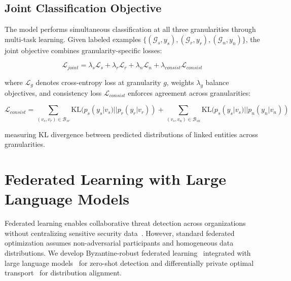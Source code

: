 \subsection{Joint Classification Objective}

The model performs simultaneous classification at all three granularities through multi-task learning. Given labeled examples $\{(\mathcal{G}_s, y_s), (\mathcal{G}_r, y_r), (\mathcal{G}_n, y_n)\}$, the joint objective combines granularity-specific losses:

\begin{equation}
\mathcal{L}_{joint} = \lambda_s \mathcal{L}_s + \lambda_r \mathcal{L}_r + \lambda_n \mathcal{L}_n + \lambda_{consist} \mathcal{L}_{consist}
\end{equation}

where $\mathcal{L}_g$ denotes cross-entropy loss at granularity $g$, weights $\lambda_g$ balance objectives, and consistency loss $\mathcal{L}_{consist}$ enforces agreement across granularities:

\begin{equation}
\mathcal{L}_{consist} = \sum_{(v_s, v_r) \in \mathcal{B}_{sr}} \text{KL}(p_s(y_s|v_s) || p_r(y_r|v_r)) + \sum_{(v_s, v_n) \in \mathcal{B}_{sn}} \text{KL}(p_s(y_s|v_s) || p_n(y_n|v_n))
\end{equation}

measuring KL divergence between predicted distributions of linked entities across granularities.

\section{Federated Learning with Large Language Models}
\label{sec:models_fedllm}

Federated learning enables collaborative threat detection across organizations without centralizing sensitive security data~\cite{mcmahan2017communication,kairouz2021advances}. However, standard federated optimization assumes non-adversarial participants and homogeneous data distributions. We develop Byzantine-robust federated learning~\cite{blanchard2017machine} integrated with large language models~\cite{brown2020language,devlin2019bert} for zero-shot detection and differentially private optimal transport~\cite{cuturi2013sinkhorn,courty2017optimal} for distribution alignment.




